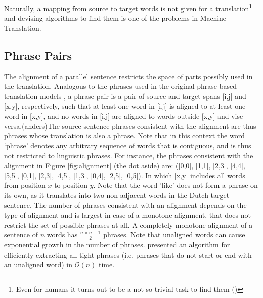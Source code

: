 \documentclass{report}
\theoremstyle{definition}
\theoremstyle{plain}
\begin{document}
Naturally, a mapping from source to target words is not given for a translation\footnote{Even for humans it turns out to be a not so trivial task to find them (\cite{och2000improved})} and devising algorithms to find them is one of the problems in Machine Translation.


\subsection{Phrase Pairs}

The alignment of a parallel sentence restricts the space of parts possibly used in the translation. Analogous to the phrases used in the original phrase-based translation models \citep{och2004alignment}, a phrase pair is a pair of source and target spans [i,j] and [x,y], respectively, such that at least one word in [i,j] is aligned to at least one word in [x,y], and no words in [i,j] are aligned to words outside [x,y] and vise versa.(anders)The source sentence phrases consistent with the alignment are thus phrases whose translation is also a phrase. Note that in this context the word `phrase' denotes any arbitrary sequence of words that is contiguous, and is thus not restricted to linguistic phrases. For instance, the phrases consistent with the alignment in Figure \ref{fig:alignment} (the dot aside) are: ([0,0], [1,1], [2,3], [4,4], [5,5], [0,1], [2,3], [4,5], [1,3], [0,4], [2,5], [0,5]). In which [x,y] includes all words from position $x$ to position $y$. Note that the word 'like' does not form a phrase on its own, as it translates into two non-adjacent words in the Dutch target sentence. The number of phrases consistent with an alignment depends on the type of alignment and is largest in case of a monotone alignment, that does not restrict the set of possible phrases at all. A completely monotone alignment of a sentence of $n$ words has $\frac{n\times n+1}{2}$ phrases. Note that unaligned words can cause exponential growth in the number of phrases.
\cite{zhang2008extracting} presented an algorithm for efficiently extracting all tight phrases (i.e. phrases that do not start or end with an unaligned word) in $\mathcal{O}(n)$ time.
\end{document}

